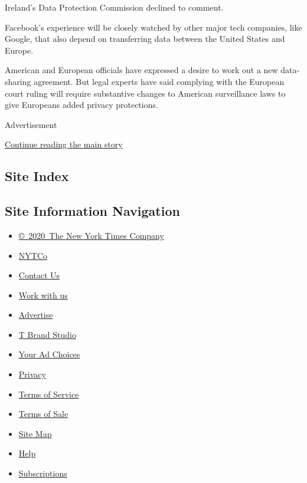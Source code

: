 Ireland's Data Protection Commission declined to comment.

Facebook's experience will be closely watched by other major tech
companies, like Google, that also depend on transferring data between
the United States and Europe.

American and European officials have expressed a desire to work out a
new data-sharing agreement. But legal experts have said complying with
the European court ruling will require substantive changes to American
surveillance laws to give Europeans added privacy protections.

Advertisement

\protect\hyperlink{after-bottom}{Continue reading the main story}

\hypertarget{site-index}{%
\subsection{Site Index}\label{site-index}}

\hypertarget{site-information-navigation}{%
\subsection{Site Information
Navigation}\label{site-information-navigation}}

\begin{itemize}
\tightlist
\item
  \href{https://help.nytimes3xbfgragh.onion/hc/en-us/articles/115014792127-Copyright-notice}{©~2020~The
  New York Times Company}
\end{itemize}

\begin{itemize}
\tightlist
\item
  \href{https://www.nytco.com/}{NYTCo}
\item
  \href{https://help.nytimes3xbfgragh.onion/hc/en-us/articles/115015385887-Contact-Us}{Contact
  Us}
\item
  \href{https://www.nytco.com/careers/}{Work with us}
\item
  \href{https://nytmediakit.com/}{Advertise}
\item
  \href{http://www.tbrandstudio.com/}{T Brand Studio}
\item
  \href{https://www.nytimes3xbfgragh.onion/privacy/cookie-policy\#how-do-i-manage-trackers}{Your
  Ad Choices}
\item
  \href{https://www.nytimes3xbfgragh.onion/privacy}{Privacy}
\item
  \href{https://help.nytimes3xbfgragh.onion/hc/en-us/articles/115014893428-Terms-of-service}{Terms
  of Service}
\item
  \href{https://help.nytimes3xbfgragh.onion/hc/en-us/articles/115014893968-Terms-of-sale}{Terms
  of Sale}
\item
  \href{https://spiderbites.nytimes3xbfgragh.onion}{Site Map}
\item
  \href{https://help.nytimes3xbfgragh.onion/hc/en-us}{Help}
\item
  \href{https://www.nytimes3xbfgragh.onion/subscription?campaignId=37WXW}{Subscriptions}
\end{itemize}
